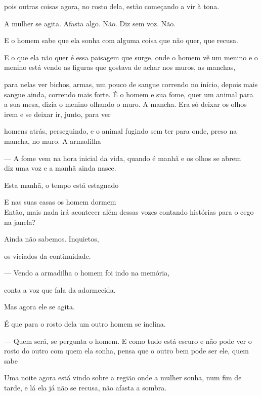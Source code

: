 pois outras coisas agora, no rosto dela, estão começando a vir à tona.

A mulher se agita. Afasta algo. Não. Diz sem voz. Não.

E o homem sabe que ela sonha com alguma coisa que não quer, que recusa.

E o que ela não quer é essa paisagem que surge, onde o homem vê um
menino e o menino está vendo as figuras que gostava de achar nos muros,
as manchas,

para nelas ver bichos, armas, um pouco de sangue correndo no início,
depois mais sangue ainda, correndo mais forte. É o homem e sua fome,
quer um animal para a sua mesa, dizia o menino olhando o muro. A mancha.
Era só deixar os olhos irem e se deixar ir, junto, para ver

homens atrás, perseguindo, e o animal fugindo sem ter para onde, preso
na mancha, no muro. A armadilha

\pagebreak

\vspace*{4cm}

--- A fome vem na hora inicial da vida, quando é manhã e os olhos se abrem\\

diz uma voz e a manhã ainda nasce.

Esta manhã, o tempo está estagnado

E nas suas casas os homem dormem\\

Então, mais nada irá acontecer além dessas vozes contando histórias para
o cego na janela?

Ainda não sabemos. Inquietos,

os viciados da continuidade.

\pagebreak

\vspace*{4cm}

--- Vendo a armadilha o homem foi indo na memória,

conta a voz que fala da adormecida.

Mas agora ele se agita.

É que para o rosto dela um outro homem se inclina.

--- Quem será, se pergunta o homem. E como tudo está escuro e não pode ver
o rosto do outro com quem ela sonha, pensa que o outro bem pode ser ele,
quem sabe

Uma noite agora está vindo sobre a região onde a mulher sonha, num fim
de tarde, e lá ela já não se recusa, não afasta a sombra.

